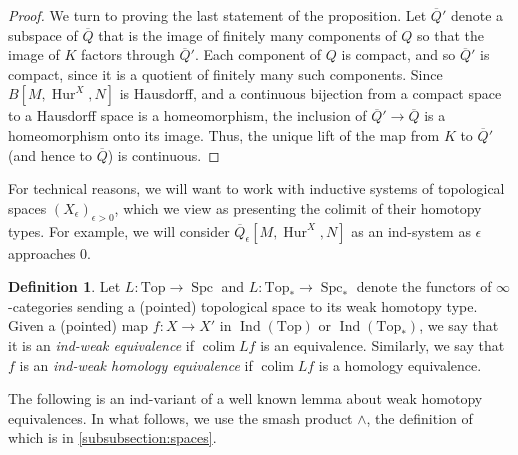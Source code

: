 \documentclass[12 pt]{amsart}
\theoremstyle{plain}
\theoremstyle{definition}
\newtheorem{definition}[theorem]{Definition}
\theoremstyle{remark}
\numberwithin{equation}{section}
\DeclareMathOperator\Spc{Spc}
\DeclareMathOperator\Ind{Ind}
\newcommand\Top{\mathrm{Top}}
\DeclareMathOperator\Hur{Hur}
\DeclareMathOperator\colim{colim}
\begin{document}
\begin{proof}
	We turn to proving the last statement of the proposition. Let
	$\overline{Q}'$ denote a subspace of $\overline{Q}$ that is the image of
	finitely many components of $Q$ so that the image of $K$ factors through
	$\overline{Q}'$. Each component of $Q$ is compact, and so $\overline{Q}'$ is compact, since it is a quotient of finitely many such components.
	Since
	$B[M,\Hur^X,N]$ is Hausdorff, 
	and a continuous bijection from a compact space to a Hausdorff space is
	a homeomorphism,
	the inclusion of $\overline{Q}' \to \overline{Q}$ is a homeomorphism onto its image. 
	Thus, the unique lift of the map from $K$ to $\overline{Q}'$ (and hence to $\overline{Q}$) is continuous.
\end{proof}

For technical reasons, we will want to work with inductive systems of
topological spaces $(X_{\epsilon})_{\epsilon > 0}$, which we view as presenting the colimit of their homotopy types. For example, we will consider $\overline{Q}_{\epsilon}[M,\Hur^{X},N]$ as an ind-system as $\epsilon$ approaches $0$.


\begin{definition}\label{definition:indweakeq}
	Let $L:\Top \to \Spc$ and $L:\Top_* \to \Spc_*$ denote the functors of $\infty$-categories sending a (pointed) topological space to its weak homotopy type.
	Given a (pointed) map $f:X \to X'$ in $\Ind(\Top)$ or $\Ind(\Top_*)$,
	we say that it is an {\em ind-weak equivalence} if $\colim Lf$ is an equivalence.
	Similarly, we say that $f$ is an {\em ind-weak homology equivalence} if $\colim Lf$
	is a homology equivalence.
\end{definition}

The following is an ind-variant of a well known lemma about weak homotopy
equivalences. In what follows, we use the smash product $\wedge$, the definition
of which is in \autoref{subsubsection:spaces}.
\end{document}
